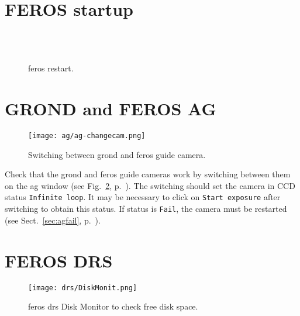 \documentclass[11pt,fleqn]{book}
\def\figref#1{Fig.~\ref{fig:#1}, p.~\pageref{fig:#1}}
\def\secref#1{Sect.~\ref{sec:#1}, p.~\pageref{sec:#1}}
\begin{document}
\section{FEROS startup}

\begin{figure}[b!]
\null\hfill
{}\hfill
{}\hfill\null\\
\null\hfill
{}\hfill
{}\hfill\null\\
\null\hfill
{}\hfill
{}\hfill\null
\caption{\gls{feros} restart.}
\label{fig:feros-restart}
\end{figure}

\newpage
\section{GROND and FEROS AG}
\begin{figure}[ht!]
\centering
\texttt{[image: ag/ag-changecam.png]}
\caption[Switching between GROND and FEROS guide cameras]{Switching between \gls{grond} and \gls{feros} guide camera.}
\label{fig:agswitch}
\end{figure}
Check that the \gls{grond} and \gls{feros} guide cameras work by
switching between them on the \gls{ag} window (see \figref{agswitch}).
The switching should set the camera in CCD status \texttt{Infinite loop}.  It 
may be necessary to click on \texttt{Start exposure} after switching to
obtain this status.  If status is \texttt{Fail}, the camera must be restarted (see  \secref{agfail}).

\section{FEROS DRS}
\begin{figure}[ht!]
\centering
\texttt{[image: drs/DiskMonit.png]}
\caption{\gls{feros} \gls{drs} Disk Monitor to check free disk space.}
\label{fig:diskmonit}
\end{figure}
\end{document}
